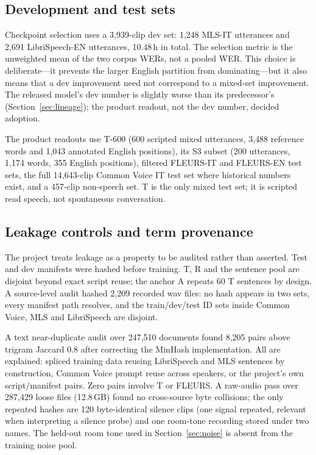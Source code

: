 \documentclass{article}
\begin{document}
\subsection{Development and test sets}

Checkpoint selection uses a 3{,}939-clip dev set: 1{,}248 MLS-IT utterances and 2{,}691
LibriSpeech-EN utterances, 10.48\,h in total. The selection metric is the unweighted mean of the
two corpus WERs, not a pooled WER. This choice is deliberate---it prevents the larger English
partition from dominating---but it also means that a dev improvement need not correspond to a
mixed-set improvement. The released model's dev number is slightly worse than its predecessor's
(Section~\ref{sec:lineage}); the product readout, not the dev number, decided adoption.

The product readouts use T-600 (600 scripted mixed utterances, 3{,}488 reference words and 1{,}043
annotated English positions), its S3 subset (200 utterances, 1{,}174 words, 355 English
positions), filtered FLEURS-IT and FLEURS-EN test sets, the full 14{,}643-clip Common Voice IT
test set where historical numbers exist, and a 457-clip non-speech set. T is the only mixed test
set; it is scripted read speech, not spontaneous conversation.

\subsection{Leakage controls and term provenance}
\label{sec:leakage}

The project treats leakage as a property to be audited rather than asserted. Test and dev
manifests were hashed before training. T, R and the sentence pool are disjoint beyond exact
script reuse; the anchor A repeats 60 T sentences by design. A source-level audit hashed 2{,}209
recorded wav files: no hash appears in two sets, every manifest path resolves, and the
train/dev/test ID sets inside Common Voice, MLS and LibriSpeech are disjoint.

A text near-duplicate audit over 247{,}510 documents found 8{,}205 pairs above trigram Jaccard
0.8 after correcting the MinHash implementation. All are explained: spliced training data reusing
LibriSpeech and MLS sentences by construction, Common Voice prompt reuse across speakers, or the
project's own script/manifest pairs. Zero pairs involve T or FLEURS. A raw-audio pass over
287{,}429 loose files (12.8\,GB) found no cross-source byte collisions; the only repeated hashes
are 120 byte-identical silence clips (one signal repeated, relevant when interpreting a silence
probe) and one room-tone recording stored under two names. The held-out room tone used in
Section~\ref{sec:noise} is absent from the training noise pool.
\end{document}
